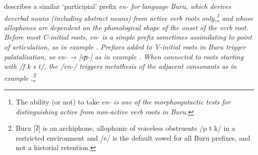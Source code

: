 
\citet[65f, 145]{Grimes1991c}
describes a similar ‘participial’ prefix \it{en-} for 
language Buru, which derives deverbal nouns (including abstract nouns) from
active verb roots only,\footnote{
		The ability (or not) to take \it{en-} is one of the morphosyntactic
		tests for distinguishing active from non-active verb roots in Buru.}
and whose allophones are dependent on the phonological shape
of the onset of the verb root.
Before most C-initial roots,
\it{en-} is a simple prefix sometimes assimilating to point of articulation,
as in example .
Prefixes added to V-initial roots in Buru trigger palatalization,
so \it{en-} → [eɲ-] as in example .
When connected to roots starting with /f k s t/,
the /en-/ triggers metathesis of the adjacent consonants as in example .\footnote{
		Buru [ʔ] is an archiphone,
		allophonic of voiceless obstruents /p t k/ in a restricted environment and
		/e/ is the default vowel for all Buru prefixes,
		and not a historial retention.}

